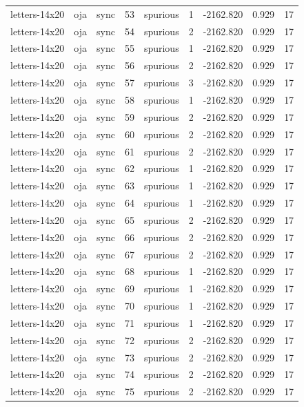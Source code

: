 \begin{tabular}{lllrlrrrr}
letters-14x20 & oja & sync & 53 & spurious & 1 & -2162.820 & 0.929 & 17 \\
letters-14x20 & oja & sync & 54 & spurious & 2 & -2162.820 & 0.929 & 17 \\
letters-14x20 & oja & sync & 55 & spurious & 1 & -2162.820 & 0.929 & 17 \\
letters-14x20 & oja & sync & 56 & spurious & 2 & -2162.820 & 0.929 & 17 \\
letters-14x20 & oja & sync & 57 & spurious & 3 & -2162.820 & 0.929 & 17 \\
letters-14x20 & oja & sync & 58 & spurious & 1 & -2162.820 & 0.929 & 17 \\
letters-14x20 & oja & sync & 59 & spurious & 2 & -2162.820 & 0.929 & 17 \\
letters-14x20 & oja & sync & 60 & spurious & 2 & -2162.820 & 0.929 & 17 \\
letters-14x20 & oja & sync & 61 & spurious & 2 & -2162.820 & 0.929 & 17 \\
letters-14x20 & oja & sync & 62 & spurious & 1 & -2162.820 & 0.929 & 17 \\
letters-14x20 & oja & sync & 63 & spurious & 1 & -2162.820 & 0.929 & 17 \\
letters-14x20 & oja & sync & 64 & spurious & 1 & -2162.820 & 0.929 & 17 \\
letters-14x20 & oja & sync & 65 & spurious & 2 & -2162.820 & 0.929 & 17 \\
letters-14x20 & oja & sync & 66 & spurious & 2 & -2162.820 & 0.929 & 17 \\
letters-14x20 & oja & sync & 67 & spurious & 2 & -2162.820 & 0.929 & 17 \\
letters-14x20 & oja & sync & 68 & spurious & 1 & -2162.820 & 0.929 & 17 \\
letters-14x20 & oja & sync & 69 & spurious & 1 & -2162.820 & 0.929 & 17 \\
letters-14x20 & oja & sync & 70 & spurious & 1 & -2162.820 & 0.929 & 17 \\
letters-14x20 & oja & sync & 71 & spurious & 1 & -2162.820 & 0.929 & 17 \\
letters-14x20 & oja & sync & 72 & spurious & 2 & -2162.820 & 0.929 & 17 \\
letters-14x20 & oja & sync & 73 & spurious & 2 & -2162.820 & 0.929 & 17 \\
letters-14x20 & oja & sync & 74 & spurious & 2 & -2162.820 & 0.929 & 17 \\
letters-14x20 & oja & sync & 75 & spurious & 2 & -2162.820 & 0.929 & 17 \\

\end{tabular}
